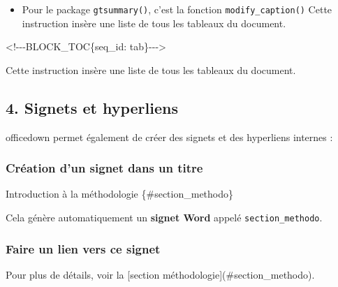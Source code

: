 \documentclass[
]{article}
\newenvironment{Shaded}{\begin{snugshade}}{\end{snugshade}}
\newcommand{\NormalTok}[1]{#1}
\providecommand{\tightlist}{%
  \setlength{\itemsep}{0pt}\setlength{\parskip}{0pt}}
\begin{document}
\begin{itemize}
\tightlist
\item
  Pour le package \texttt{gtsummary()}, c'est la fonction
  \texttt{modify\_caption()} Cette instruction insère une liste de tous
  les tableaux du document.
\end{itemize}

\begin{Shaded}
\begin{Highlighting}[]
\NormalTok{\textless{}!{-}{-}{-}BLOCK\_TOC\{seq\_id: \textquotesingle{}tab\textquotesingle{}\}{-}{-}{-}\textgreater{}}
\end{Highlighting}
\end{Shaded}

Cette instruction insère une liste de tous les tableaux du document.

\subsection{4. Signets et hyperliens}\label{signets-et-hyperliens}

officedown permet également de créer des signets et des hyperliens
internes :

\subsubsection{Création d'un signet dans un
titre}\label{cruxe9ation-dun-signet-dans-un-titre}

\begin{Shaded}
\begin{Highlighting}[]
\NormalTok{Introduction à la méthodologie \{\#section\_methodo\}}
\end{Highlighting}
\end{Shaded}

Cela génère automatiquement un \textbf{signet Word} appelé
\texttt{section\_methodo}.

\subsubsection{Faire un lien vers ce
signet}\label{faire-un-lien-vers-ce-signet}

\begin{Shaded}
\begin{Highlighting}[]
\NormalTok{Pour plus de détails, voir la [section méthodologie](\#section\_methodo).}
\end{Highlighting}
\end{Shaded}
\end{document}
